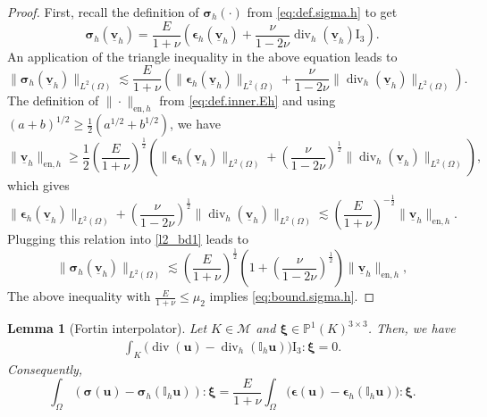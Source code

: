 \documentclass[a4paper,11pt]{article}
\newtheorem{lemma}[theorem]{Lemma}
\theoremstyle{definition}
\theoremstyle{remark}
\newcommand{\norm}[2]{\|#2\|_{#1}}
\newcommand{\uvec}[1]{\underline{\mathbf{#1}}}
\newcommand{\bo}[1]{\mathbf{#1}}
\newcommand{\bos}[1]{\boldsymbol{#1}}
\newcommand{\mI}[1]{\mathbb I_h\bo{#1}}
\def\P{\mathbb{P}}
\def\bsig{\boldsymbol{\sigma}}
\def\be{\boldsymbol{\epsilon}}
\newcommand{\Id}{\mathrm{I}_3}
\def\cM{\mathcal{M}}
\def\O{\Omega}
\newcommand{\DIV}{\operatorname{\mathrm{div}}}
\begin{document}
\begin{proof}
First, recall the definition of $\bsig_h(\cdot)$ from \eqref{eq:def.sigma.h} to get
\begin{equation*}
    \bsig_h(\uvec{v}_h)= \frac{E}{1+\nu}\left(\be_h(\uvec{v}_h)+\frac{\nu}{1-2\nu} \DIV_h(\uvec{v}_h)\Id\right).
\end{equation*}
An application of the triangle inequality in the above equation leads to
\begin{equation}
\norm{L^2(\O)}{\bsig_h(\uvec{v}_h)} \lesssim \frac{E}{1+\nu}\left(\norm{L^2(\O)}{\be_h(\uvec{v}_h)}+\frac{\nu}{1-2\nu}\norm{L^2(\O)}{ \DIV_h(\uvec{v}_h)}\right). \label{l2_bd1}
\end{equation}
The definition of $\norm{\mathrm{en},h}{{\cdot}}$ from \eqref{eq:def.inner.Eh} and using $(a+b)^{1/2}\ge \frac12 (a^{1/2}+b^{1/2})$, we have
$$
\norm{\mathrm{en},h}{\uvec{v}_h}\ge \frac12 \left(\frac{E}{1+\nu}\right)^{\frac{1}{2}}
\left(\norm{L^2(\O)}{\be_h(\uvec{v}_h)}+\left(\frac{\nu}{1-2\nu}\right)^{\frac{1}{2}}\norm{L^2(\O)}{\DIV_h(\uvec{v}_h)}\right),
$$
which gives
$$
\norm{L^2(\O)}{\be_h(\uvec{v}_h)}+\left(\frac{\nu}{1-2\nu}\right)^{\frac{1}{2}}\norm{L^2(\O)}{\DIV_h(\uvec{v}_h)}\lesssim
\left(\frac{E}{1+\nu}\right)^{-\frac{1}{2}}\norm{\mathrm{en},h}{\uvec{v}_h}.
$$
Plugging this relation into \eqref{l2_bd1} leads to
$$
\norm{L^2(\O)}{\bsig_h(\uvec{v}_h)}
\lesssim \left(\frac{E}{1+\nu}\right)^{\frac{1}{2}}\left(1+\left(\frac{\nu}{1-2\nu}\right)^{\frac{1}{2}}\right)\norm{\mathrm{en},h}{\uvec{v}_h},
$$
The above inequality with $\frac{E}{1+\nu} \leq \mu_{2}$ implies \eqref{eq:bound.sigma.h}. 
\end{proof}

\begin{lemma}[Fortin interpolator]\label{lem:fortin}
Let $K\in\cM$ and $\bos{\xi}\in \P^1(K)^{3\times 3}$. Then, we have 
\begin{align*}
\int_K \big(\DIV(\bo{u})-\DIV_h(\mI{u})\big)\Id\colon\bos{\xi}=0.
\end{align*}
Consequently,\
\begin{equation}\label{eq:Pi1.proj.sigma}
\int_\Omega (\bsig(\bo{u})-\bsig_h(\mI{u}))\colon \bos{\xi}=\frac{E}{1+\nu}\int_\Omega \big(\be(\bo{u})-\be_h(\mI{u})\big)\colon\bos{\xi}.
\end{equation}
\end{lemma}
\end{document}
